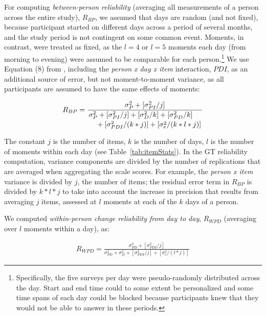 \documentclass[jou,a4paper,draftfirst]{apa6}\usepackage[]{graphicx}\usepackage[]{color}
\begin{document}
For computing \emph{between-person reliability} (averaging all measurements of a person across the entire study), $R_{BP}$, we assumed that days are random (and not fixed), because participant started on different days across a period of several months, and the study period is not contingent on some common event. Moments, in contrast, were treated as fixed, as the $l = 4$ or $l = 5$ moments each day (from morning to evening) were assumed to be comparable for each person.\footnote{Specifically, the five surveys per day were pseudo-randomly distributed across the day. Start and end time could to some extent be personalized and some time spans of each day could be blocked because participants knew that they would not be able to answer in these periods.} We use Equation (8) from \textcite{shrout_Psychometrics_2012}, including the \emph{person x day x item} interaction, $PDI$, as an additional source of error, but not moment-to-moment variance, as all participants are assumed to have the same effects of moments:

\begin{equation}
\label{eq:R_BP}
\begin{split}
R_{BP} = \frac{ 
		\sigma^2_{P} + [\sigma^2_{PI} / j] 	
	}{ 	
		\splitdfrac{
			\sigma^2_{P} + [\sigma^2_{PI} / j] + [\sigma^2_{D} / k] + [\sigma^2_{PD} / k] }
			{ + [\sigma^2_{PDI} / (k*j)] + [\sigma^2_{e} / (k*l*j)]}
	}
\end{split}
\end{equation}

The constant $j$ is the number of items, $k$ is the number of days, $l$ is the number of moments within each day (see Table~\ref{tab:itemStats}).
In the GT reliability computation, variance components are divided by the number of replications that are averaged when aggregating the scale scores. For example, the \emph{person x item} variance is divided by $j$, the number of items; the residual error term in $R_{BP}$ is divided by $k*l*j$ to take into account the increase in precision that results from averaging $j$ items, assessed at $l$ moments at each of the $k$ days of a person.

We computed \emph{within-person change reliability from day to day}, $R_{WPD}$ (averaging over $l$ moments within a day), as:

\begin{equation}
\label{eq:R_WPD}
\begin{split}
R_{WPD} = \frac{ 
		\sigma^2_{PD} + [\sigma^2_{PDI} / j] 	
	}{ 	
		\sigma^2_{PD} + \sigma^2_{D} + [\sigma^2_{PDI} / j] + [\sigma^2_{e} / (l*j)] 
	}
\end{split}
\end{equation}
\end{document}
